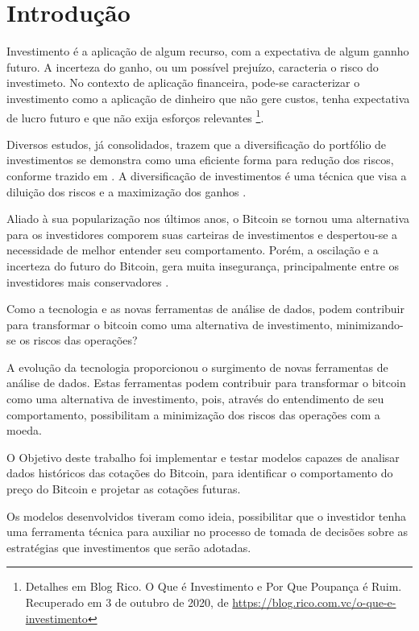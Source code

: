 \documentclass[12pt]{article}
\begin{document}
\section{Introdução}

Investimento é a aplicação de algum recurso, com a expectativa de algum gannho 
futuro. A incerteza do ganho, ou um possível prejuízo, caracteria o risco do
investimeto. No contexto de aplicação financeira, pode-se caracterizar o 
investimento como a aplicação de dinheiro que não gere custos, tenha expectativa
de lucro futuro e que não exija esforços relevantes \footnote{Detalhes em Blog 
Rico. O Que é Investimento e Por Que Poupança é Ruim. Recuperado em 3 de
outubro de 2020, de \url{https://blog.rico.com.vc/o-que-e-investimento}}.

Diversos estudos, já consolidados, trazem que a diversificação do portfólio
de investimentos se demonstra como uma eficiente forma para redução dos riscos, 
conforme trazido em \cite{oda1998estudo}. A diversificação de investimentos é 
uma técnica que visa a diluição dos riscos e a maximização dos ganhos
\cite{btg:2017}.

Aliado à sua popularização nos últimos anos, o Bitcoin se tornou uma alternativa 
para os investidores comporem suas carteiras de investimentos e despertou-se a
necessidade de melhor entender seu comportamento. Porém, a oscilação e a 
incerteza do futuro do Bitcoin, gera muita insegurança, principalmente entre os 
investidores mais conservadores \cite{uol:2020}.

Como a tecnologia e as novas ferramentas de análise de dados, podem contribuir 
para transformar o bitcoin como uma alternativa de investimento, minimizando-se
os riscos das operações?

A evolução da tecnologia proporcionou o surgimento de novas ferramentas de 
análise de dados. Estas ferramentas podem contribuir para transformar o bitcoin 
como uma alternativa de investimento, pois, através do entendimento de seu 
comportamento, possibilitam a minimização dos riscos das operações com a moeda.

O Objetivo deste trabalho foi implementar e testar modelos capazes de analisar
dados históricos das cotações do Bitcoin, para identificar o comportamento do 
preço do Bitcoin e projetar as cotações futuras.

Os modelos desenvolvidos tiveram como ideia, possibilitar que o investidor tenha 
uma ferramenta técnica para auxiliar no processo de tomada de decisões sobre as 
estratégias que investimentos que serão adotadas.
\end{document}
